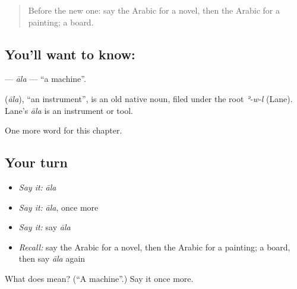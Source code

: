 \label{lesson:AR-C186-ala}



\begin{quote}
Before the new one: say the Arabic for a novel, then the Arabic for a painting; a board.
\end{quote}

\subsection*{You'll want to know: }
\textbf{} — \emph{āla} — \textquotedblleft{}a machine\textquotedblright{}.

\begin{cousinweb}
\textbf{} (\emph{āla}), \textquotedblleft{}an instrument\textquotedblright{}, is an old native noun, filed under the root \emph{ʾ-w-l} (Lane). Lane's \emph{āla} is an instrument or tool.
\end{cousinweb}

\begin{grammarlens}[title={What you've built}]
One more word for this chapter.
\end{grammarlens}

\subsection*{Your turn}
\begin{itemize}
\raggedright
  \item \emph{Say it:} \emph{āla}
  \item \emph{Say it:} \emph{āla}, once more
  \item \emph{Say it:} say \emph{āla}
  \item \emph{Recall:} say the Arabic for a novel, then the Arabic for a painting; a board, then say \emph{āla} again
\end{itemize}

\begin{tcolorbox}[breakable,colback=teal!4,colframe=teal!35!black,title={Before you move on}]
What does  mean? (\textquotedblleft{}A machine\textquotedblright{}.) Say it once more.
\end{tcolorbox}
